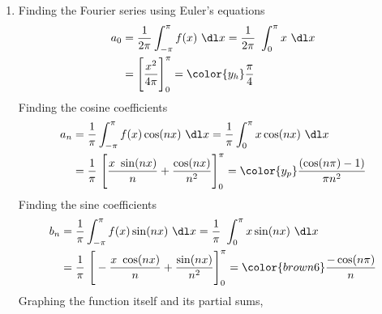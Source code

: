 \begin{enumerate}
    \item Finding the Fourier series using Euler's equations
          \begin{align}
              a_0 & = \frac{1}{2\pi} \int_{-\pi}^{\pi} f(x)\ \dl x
              = \frac{1}{2\pi}\ \int_{0}^{\pi} x\ \dl x            \\
                  & = \Bigg[ \frac{x^2}{4\pi} \Bigg]_0^{\pi}
              = \color{y_h} \frac{\pi}{4}
          \end{align}
          Finding the cosine coefficients
          \begin{align}
              a_n & = \frac{1}{\pi} \int_{-\pi}^{\pi} f(x) \cos(nx)\ \dl x
              = \frac{1}{\pi}\int_{0}^{\pi} x \cos(nx)\ \dl x              \\
                  & = \frac{1}{\pi}\ \Bigg[ \frac{x\ \sin(nx)}{n}
                  + \frac{\cos(nx)}{n^2} \Bigg]_0^{\pi}
              = \color{y_p} \frac{(\cos(n\pi) - 1)}{\pi n^2}
          \end{align}
          Finding the sine coefficients
          \begin{align}
              b_n & = \frac{1}{\pi} \int_{-\pi}^{\pi} f(x) \sin(nx)\ \dl x
              = \frac{1}{\pi}\ \int_{0}^{\pi} x \sin(nx)\ \dl x            \\
                  & = \frac{1}{\pi}\ \Bigg[ -\frac{x\ \cos(nx)}{n}
                  + \frac{\sin(nx)}{n^2} \Bigg]_{0}^{\pi}
              = \color{brown6} \frac{-\cos(n\pi)}{n}
          \end{align}
          Graphing the function itself and its partial sums,
          \begin{figure}[H]
              \centering
\end{figure}
\end{enumerate}
